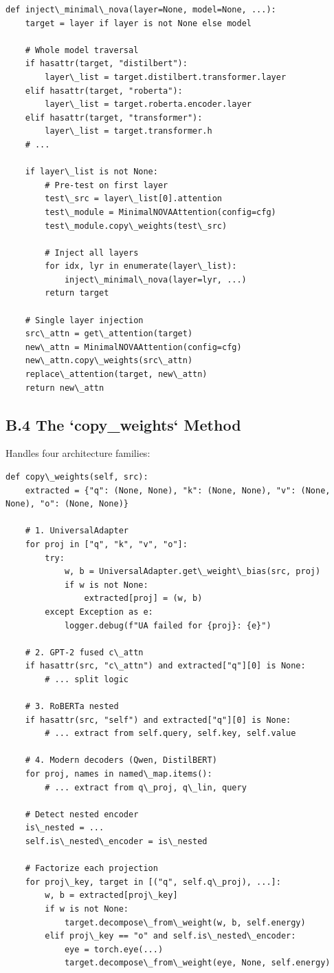 \begin{lstlisting}
def inject\_minimal\_nova(layer=None, model=None, ...):
    target = layer if layer is not None else model
    
    # Whole model traversal
    if hasattr(target, "distilbert"):
        layer\_list = target.distilbert.transformer.layer
    elif hasattr(target, "roberta"):
        layer\_list = target.roberta.encoder.layer
    elif hasattr(target, "transformer"):
        layer\_list = target.transformer.h
    # ...
    
    if layer\_list is not None:
        # Pre-test on first layer
        test\_src = layer\_list[0].attention
        test\_module = MinimalNOVAAttention(config=cfg)
        test\_module.copy\_weights(test\_src)
        
        # Inject all layers
        for idx, lyr in enumerate(layer\_list):
            inject\_minimal\_nova(layer=lyr, ...)
        return target
    
    # Single layer injection
    src\_attn = get\_attention(target)
    new\_attn = MinimalNOVAAttention(config=cfg)
    new\_attn.copy\_weights(src\_attn)
    replace\_attention(target, new\_attn)
    return new\_attn
\end{lstlisting}

\subsection{B.4 The `copy\_weights` Method}

Handles four architecture families:

\begin{lstlisting}
def copy\_weights(self, src):
    extracted = {"q": (None, None), "k": (None, None), "v": (None, None), "o": (None, None)}
    
    # 1. UniversalAdapter
    for proj in ["q", "k", "v", "o"]:
        try:
            w, b = UniversalAdapter.get\_weight\_bias(src, proj)
            if w is not None:
                extracted[proj] = (w, b)
        except Exception as e:
            logger.debug(f"UA failed for {proj}: {e}")
    
    # 2. GPT-2 fused c\_attn
    if hasattr(src, "c\_attn") and extracted["q"][0] is None:
        # ... split logic
    
    # 3. RoBERTa nested
    if hasattr(src, "self") and extracted["q"][0] is None:
        # ... extract from self.query, self.key, self.value
    
    # 4. Modern decoders (Qwen, DistilBERT)
    for proj, names in named\_map.items():
        # ... extract from q\_proj, q\_lin, query
    
    # Detect nested encoder
    is\_nested = ...
    self.is\_nested\_encoder = is\_nested
    
    # Factorize each projection
    for proj\_key, target in [("q", self.q\_proj), ...]:
        w, b = extracted[proj\_key]
        if w is not None:
            target.decompose\_from\_weight(w, b, self.energy)
        elif proj\_key == "o" and self.is\_nested\_encoder:
            eye = torch.eye(...)
            target.decompose\_from\_weight(eye, None, self.energy)
\end{lstlisting}

